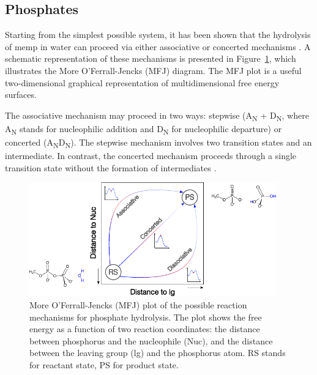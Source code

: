 \subsection{Phosphates} \label{subsec:phosphates}
Starting from the simplest possible system, it has been shown that the hydrolysis of \ac{memp} in water can proceed via either associative or concerted mechanisms \citep{kamerlinWhyNatureReally2013, kamerlinAssociativeDissociativeMechanisms2008, klahnMechanismHydrolysisPhosphate2006, duarteResolvingApparentConflicts2015}. A schematic representation of these mechanisms is presented in Figure~\ref{fig:mfj_plot}, which illustrates the More O'Ferrall-Jencks (MFJ) diagram. The MFJ plot is a useful two-dimensional graphical representation of multidimensional free energy surfaces.

The associative mechanism may proceed in two ways: stepwise (A\textsubscript{N} + D\textsubscript{N}, where A\textsubscript{N} stands for nucleophilic addition and D\textsubscript{N} for nucleophilic departure) or concerted (A\textsubscript{N}D\textsubscript{N}). The stepwise mechanism involves two transition states and an intermediate. In contrast, the concerted mechanism proceeds through a single transition state without the formation of intermediates \citep{duarteResolvingApparentConflicts2015}.

\begin{figure}[t!]
    \centering
    \includegraphics[width=0.95\textwidth]{Figures/1_Introduction/intro_mfj_plot.pdf}
    \caption{More O'Ferrall-Jencks (MFJ) plot of the possible reaction mechanisms for phosphate hydrolysis. The plot shows the free energy as a function of two reaction coordinates: the distance between phosphorus and the nucleophile (Nuc), and the distance between the leaving group (lg) and the phosphorus atom. RS stands for reactant state, PS for product state.}
    \label{fig:mfj_plot}
\end{figure}

